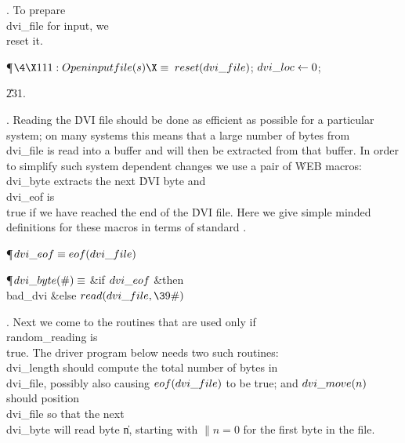 . To prepare \\{dvi\_file} for input, we \\{reset} it.

\Y\P$\4\X111:Open input file(s)\X\S$\6
$\\{reset}(\\{dvi\_file})$;%
\6
$\\{dvi\_loc}\K0$;\par
\U231.\fi

. Reading the \.{DVI} file should be done as efficient as possible for a
particular system; on many systems this means that a large number of
bytes from \\{dvi\_file} is read into a buffer and will then be extracted
from that buffer. In order to simplify such system dependent changes
we use a pair of \.{WEB} macros: \\{dvi\_byte} extracts the next \.{DVI}
byte and \\{dvi\_eof} is \\{true} if we have reached the end of the \.{DVI}
file. Here we give simple minded definitions for these macros in terms
of standard \PASCAL.

\Y\P\D {}$\\{dvi\_eof}\S\\{eof}(\\{dvi\_file})$\par
\P\D {}$\\{dvi\_byte}(\#)\S$\1\6
\&{if} $\\{dvi\_eof}$ \1\&{then}\5
\\{bad\_dvi}\6
\4\&{else} $\\{read}(\\{dvi\_file},\39\#)$\2\2\par
\fi

. Next we come to the routines that are used only if \\{random\_reading}
is
\\{true}. The driver program below needs two such routines: \\{dvi\_length}
should
compute the total number of bytes in \\{dvi\_file}, possibly also
causing $\\{eof}(\\{dvi\_file})$ to be true; and $\\{dvi\_move}(\|n)$ should
position
\\{dvi\_file} so that the next \\{dvi\_byte} will read byte \|n, starting with
$\|n=0$ for the first byte in the file.


